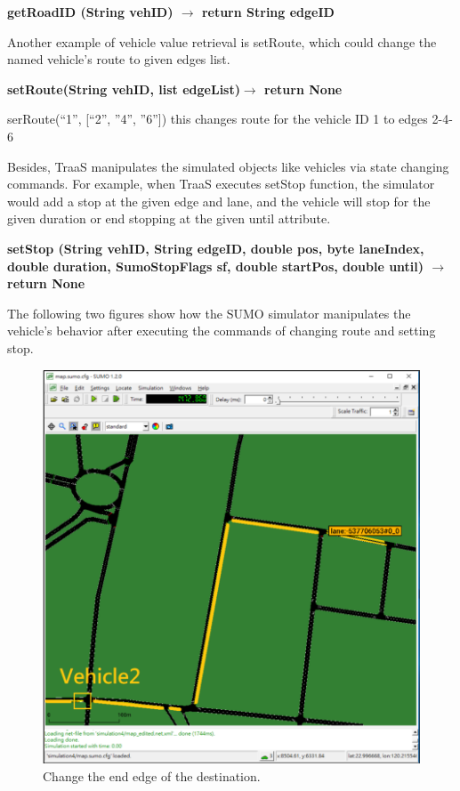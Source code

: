 \documentclass[12pt]{ksthesis}
\begin{document}
\begin{thesis}
{\textbf{getRoadID (String vehID) $\rightarrow$ return String edgeID}


Another example of vehicle value retrieval is setRoute, which could change the named vehicle’s route to given edges list.

\textbf{setRoute(String vehID, list edgeList)$\rightarrow$ return None}

serRoute(“1”, [“2”, ”4”, ”6”]) this changes route for the vehicle ID 1 to edges 2-4-6

Besides, TraaS manipulates the simulated objects like vehicles via state changing commands. For example, when TraaS executes setStop function, the simulator would add a stop at the given edge and lane, and the vehicle will stop for the given duration or end stopping at the given until attribute.
 
\textbf{setStop (String vehID, String edgeID, double pos, byte laneIndex, double duration, SumoStopFlags sf, double startPos, double until) $\rightarrow$ return None}
 
The following two figures show how the SUMO simulator manipulates the vehicle’s behavior after executing the commands of changing route and setting stop.


\begin{figure}[H]
\centering
\includegraphics[scale=0.6]{./Thesis_figures/F4-3_Change_endEdge.PNG}
\caption{\large Change the end edge of the destination.}
\vspace{0.2cm}
\label{Fig:Change_endEdge}
\end{figure}

}
\end{thesis}
\end{document}
